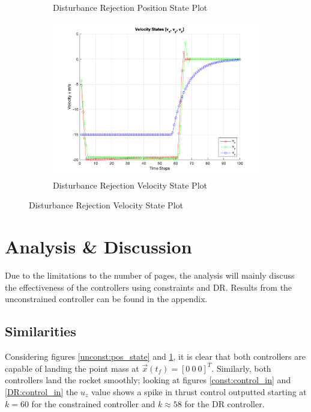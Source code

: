 \documentclass[conference, tikz]{IEEEtran}
\begin{document}
\begin{figure}[H]
\begin{subfigure}{\columnwidth}
        \caption{Disturbance Rejection Position State Plot}
        \label{DR:pos_state}
    \end{subfigure}
    \begin{subfigure}{\columnwidth}
        \centering
        \includegraphics[width=\columnwidth]{new_final_figs/DR_Constrained_velocity_state_plot.png}
        \caption{Disturbance Rejection Velocity State Plot}
        \label{DR:vel_ss}
    \end{subfigure}
\end{figure}

\section{Analysis \& Discussion}
Due to the limitations to the number of pages, the analysis will mainly discuss the effectiveness of the controllers using constraints and DR. Results from the unconstrained controller can be found in the appendix.

\subsection{Similarities}
Considering figures \ref{unconst:pos_state} and \ref{DR:pos_state}, it is clear that both controllers are capable of landing the point mass at $\vec x(t_f) = [0 \ 0 \ 0]^T$. Similarly, both controllers land the rocket smoothly; looking at figures \ref{const:control_in} and \ref{DR:control_in} the $u_z$ value shows a spike in thrust control outputted starting at $k=60$ for the constrained controller and $k\approx58$ for the DR controller.
\end{document}
